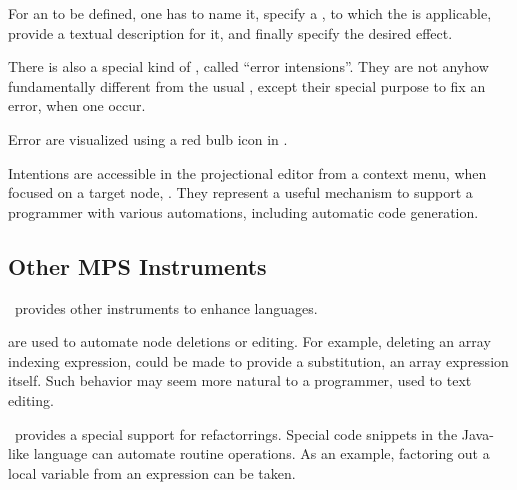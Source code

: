 For an  to be defined, one has to name it, specify a , to which the  is applicable,
provide a textual description for it, and finally specify the desired effect. 

There is also a special kind of , called ``error intensions''. They are not anyhow fundamentally different 
from the usual , except their special purpose to fix an error, when one occur. 

Error  are visualized using a red bulb icon in \jbmps.

Intentions are accessible in the projectional editor from a context menu, when focused on a target node, . They represent 
a useful mechanism to support a programmer with various automations, including automatic code generation.


\subsection{Other MPS Instruments}

\jbmps\ provides other instruments to enhance languages. 

 are used to automate node deletions or editing. For example, deleting an array indexing expression, could be made
to provide a substitution, an array expression itself. Such behavior may seem more natural to a programmer, used to text editing.

\jbmps\ provides a special support for refactorrings. Special code snippets in the Java-like language can automate routine operations.
As an example, factoring out a local variable from an expression can be taken.